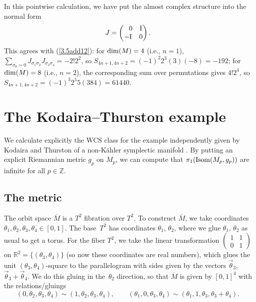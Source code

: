 \documentclass[pdftex]{sigma}
\numberwithin{equation}{section}
\theoremstyle{definition}
\newcommand{\BbR}{{\mathbb R}}
\newcommand{\BbZ}{{\mathbb Z}}
\newcommand{\Z}{\BbZ}
\newcommand{\R}{\BbR}
\newcommand{\om}{\overline{M}}
\newcommand{\omp}{M_p}
\begin{document}
In this pointwise calculation, we have
put the almost complex structure into the normal form
\[J = \begin{pmatrix} \hphantom{-} 0& \rm I\\ -\rm I&0\end{pmatrix}.\]
This agrees with (\ref{3.5add12}): for ${\rm dim}(M)=4$ (i.e., $n=1$), $\sum _{\sigma_0=0} J_{\sigma_1\sigma_2}J_{\sigma_3\sigma_4} =
-2!2^2$, so $S_{4n+1,4n+2} = (-1)^2 2^3(3) (-8) =-192$; for ${\rm dim}(M)=8$ (i.e., $n=2$), the corresponding
sum over permutations gives $4!2^4$, so
$S_{4n+1,4n+2} = (-1)^3 2^5 5 (384)= 61440$.

\section{The Kodaira--Thurston example}\label{section4}

We calculate explicitly the WCS class for the example independently given by Kodaira \cite{Kodaira} and
Thurston \cite{Thurston} of a non-K\"ahler symplectic manifold \smash{$\om^4$}. By putting an explicit Riemannian metric $g_p$ on $M_p$, we can compute that
$\pi_1({\rm Isom}(\omp, g_p))$ are infinite for all $p\in \Z$.


\subsection{The metric}%
The orbit space $\om$ is
a $T^2$ fibration over $T^2$. To construct $\om$, we take coordinates $\theta_1, \theta_2,\theta_3,\theta_4\in [0,1]$. The base~$T^2 $ has coordinates $\theta_1$, $\theta_2$, where we glue $\theta_1$, $\theta_2$ as usual to get
a torus. For the fiber $T^2$, we take the linear transformation
$\left(\begin{smallmatrix} 1&1\\0&1\end{smallmatrix}\right)$
on $\R^2 = \{(\theta_3,\theta_4)\}$ (so now these coordinates are real numbers), which glues
the unit $(\theta_3,\theta_4)$-square to the parallelogram with sides given by the vectors $\vec\theta_3$,
 $\vec \theta_3 + \vec\theta_4$. We do this gluing in the~$\theta_2$ direction, so that $\om$ is given by
 $[0,1]^4$ with the relations/gluings
 \[(0,\theta_2,\theta_3,\theta_4) \sim (1,\theta_2,\theta_3,\theta_4), \qquad
(\theta_1,0,\theta_3,\theta_4) \sim (\theta_1, 1, \theta_3, \theta_3+\theta_4).\]
\end{document}
